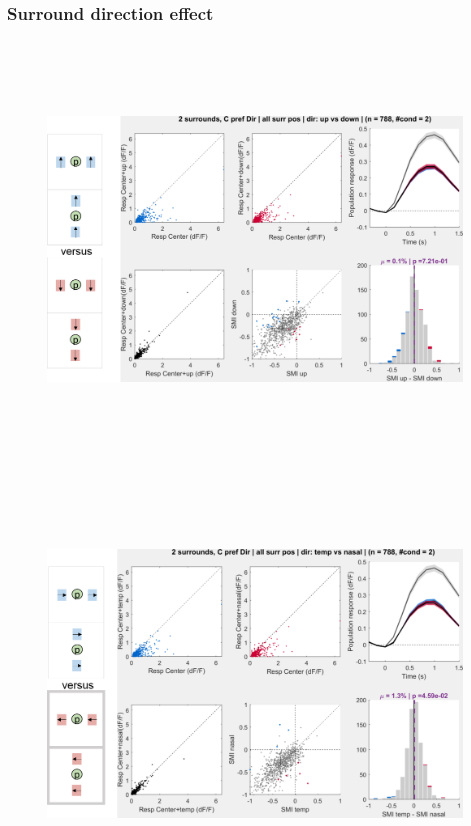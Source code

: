 \subsubsection{Surround direction effect}

\begin{figure}[H] \centering \includegraphics[width=11cm,height=11cm,keepaspectratio]{Figures/7.Results/population/sel/diagrams/4.png} 
\end{figure}

\begin{figure}[H] \centering \includegraphics[width=11cm,height=11cm,keepaspectratio]{Figures/7.Results/population/sel/diagrams/5.png} 
\end{figure}


